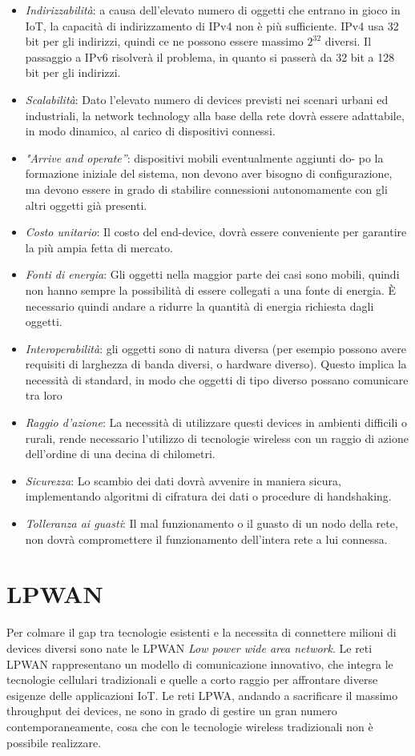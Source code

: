 \begin{itemize}
\item \textit{Indirizzabilità}: a causa dell’elevato numero di oggetti che entrano in
gioco in IoT, la capacità di indirizzamento di IPv4 non è più sufficiente. 
IPv4 usa 32 bit per gli indirizzi, quindi ce ne possono essere
massimo $2^{32}$ diversi. Il passaggio a IPv6 risolverà il problema, in quanto si passerà da
32 bit a 128 bit per gli indirizzi. 
\item \textit{Scalabilità}: Dato l'elevato numero di devices previsti nei scenari
urbani ed industriali, la network technology alla base della rete dovrà essere 
adattabile, in modo dinamico, al carico di dispositivi connessi.
\item \textit{"Arrive and operate”}: dispositivi mobili eventualmente aggiunti do-
po la formazione iniziale del sistema, non devono aver bisogno di
configurazione, ma devono essere in grado di stabilire connessioni
autonomamente con gli altri oggetti già presenti.
\item \textit{Costo unitario}: Il costo del end-device, dovrà essere conveniente
per garantire la più ampia fetta di mercato.
\item \textit{Fonti di energia}: 
Gli oggetti nella maggior parte dei casi sono mobili, quindi non hanno sempre la possibilità di essere collegati a una fonte di energia. 
È necessario quindi andare a ridurre la quantità di energia richiesta dagli
oggetti.

\item \textit{Interoperabilità}: gli oggetti sono di natura diversa (per esempio
possono avere requisiti di larghezza di banda diversi, o hardware diverso).
Questo implica la necessità di standard, in modo che oggetti di tipo
diverso possano comunicare tra loro
\item \textit{Raggio d'azione}: La necessità di utilizzare questi devices in ambienti
difficili o rurali, rende necessario l'utilizzo di tecnologie wireless con un
raggio di azione dell'ordine di una decina di chilometri.
\item \textit{Sicurezza}: Lo scambio dei dati dovrà avvenire in maniera sicura,
implementando algoritmi di cifratura dei dati o procedure di handshaking.
\item \textit{Tolleranza ai guasti}: Il mal funzionamento  o il guasto di un
nodo della rete,  non dovrà compromettere il funzionamento dell'intera rete a lui connessa. 
\end{itemize}

\section{LPWAN}
Per colmare il gap tra tecnologie esistenti e la
necessita di connettere milioni di devices diversi sono nate le  LPWAN
\emph{Low power wide area network}.
Le reti LPWAN rappresentano un modello  di comunicazione
innovativo, che integra le tecnologie cellulari tradizionali e quelle a corto
raggio per affrontare diverse esigenze delle applicazioni IoT. 
Le reti LPWA, andando a sacrificare il massimo throughput dei devices, ne sono in
grado di gestire un gran numero contemporaneamente, cosa che con le tecnologie
wireless tradizionali non è possibile realizzare.

